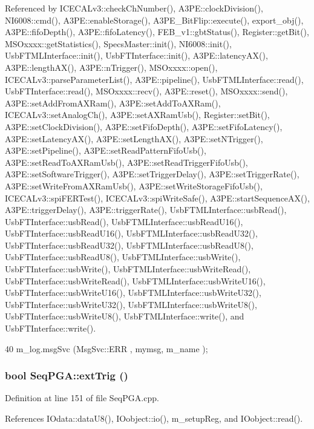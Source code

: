 Referenced by ICECALv3::checkChNumber(), A3PE::clockDivision(), NI6008::cmd(), A3PE::enableStorage(), A3PE\_\-BitFlip::execute(), export\_\-obj(), A3PE::fifoDepth(), A3PE::fifoLatency(), FEB\_\-v1::gbtStatus(), Register::getBit(), MSOxxxx::getStatistics(), SpecsMaster::init(), NI6008::init(), UsbFTMLInterface::init(), UsbFTInterface::init(), A3PE::latencyAX(), A3PE::lengthAX(), A3PE::nTrigger(), MSOxxxx::open(), ICECALv3::parseParameterList(), A3PE::pipeline(), UsbFTMLInterface::read(), UsbFTInterface::read(), MSOxxxx::recv(), A3PE::reset(), MSOxxxx::send(), A3PE::setAddFromAXRam(), A3PE::setAddToAXRam(), ICECALv3::setAnalogCh(), A3PE::setAXRamUsb(), Register::setBit(), A3PE::setClockDivision(), A3PE::setFifoDepth(), A3PE::setFifoLatency(), A3PE::setLatencyAX(), A3PE::setLengthAX(), A3PE::setNTrigger(), A3PE::setPipeline(), A3PE::setReadPatternFifoUsb(), A3PE::setReadToAXRamUsb(), A3PE::setReadTriggerFifoUsb(), A3PE::setSoftwareTrigger(), A3PE::setTriggerDelay(), A3PE::setTriggerRate(), A3PE::setWriteFromAXRamUsb(), A3PE::setWriteStorageFifoUsb(), ICECALv3::spiFERTest(), ICECALv3::spiWriteSafe(), A3PE::startSequenceAX(), A3PE::triggerDelay(), A3PE::triggerRate(), UsbFTMLInterface::usbRead(), UsbFTInterface::usbRead(), UsbFTMLInterface::usbReadU16(), UsbFTInterface::usbReadU16(), UsbFTMLInterface::usbReadU32(), UsbFTInterface::usbReadU32(), UsbFTMLInterface::usbReadU8(), UsbFTInterface::usbReadU8(), UsbFTMLInterface::usbWrite(), UsbFTInterface::usbWrite(), UsbFTMLInterface::usbWriteRead(), UsbFTInterface::usbWriteRead(), UsbFTMLInterface::usbWriteU16(), UsbFTInterface::usbWriteU16(), UsbFTMLInterface::usbWriteU32(), UsbFTInterface::usbWriteU32(), UsbFTMLInterface::usbWriteU8(), UsbFTInterface::usbWriteU8(), UsbFTMLInterface::write(), and UsbFTInterface::write().


\begin{DoxyCode}
40 { m_log.msgSvc (MsgSvc::ERR     , mymsg, m_name ); }
\end{DoxyCode}
\hypertarget{classSeqPGA_ae2e0917c379649d106539cc3b8b9ca3c}{
\subsubsection[{extTrig}]{\setlength{\rightskip}{0pt plus 5cm}bool SeqPGA::extTrig ()}}
\label{classSeqPGA_ae2e0917c379649d106539cc3b8b9ca3c}


Definition at line 151 of file SeqPGA.cpp.

References IOdata::dataU8(), IOobject::io(), m\_\-setupReg, and IOobject::read().

